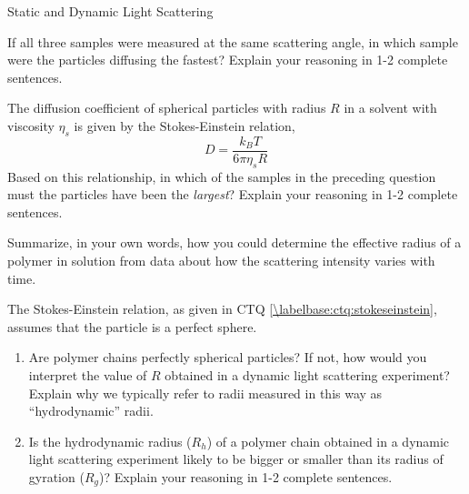 \begin{activity}{Static and Dynamic Light Scattering}
\begin{ctqs}
		If all three samples were measured at the same scattering angle, in which sample were the particles diffusing the fastest?  Explain your reasoning in 1-2 complete sentences.
	
		\begin{solution}[1.25in]{}
		\end{solution}
	
	\question The diffusion coefficient of spherical particles with radius $R$ in a solvent with viscosity $\eta_s$ is given by the Stokes-Einstein relation,
	\begin{equation*}
		D = \frac{ k_B T}{6\pi \eta_s R}
	\end{equation*}
	Based on this relationship, in which of the samples in the preceding question must the particles have been the \emph{largest}?  Explain your reasoning in 1-2 complete sentences. \label{\labelbase:ctq:stokeseinstein}
	
		\begin{solution}[1.25in]{}
		\end{solution}
	
	\question Summarize, in your own words, how you could determine the effective radius of a polymer in solution from data about how the scattering intensity varies with time.
	
		\begin{solution}[1.5in]{}
		\end{solution}

\end{ctqs}



\begin{exercises}

	\exercise The Stokes-Einstein relation, as given in CTQ \ref{\labelbase:ctq:stokeseinstein}, assumes that the particle is a perfect sphere.
	
		\begin{enumerate}
		
			\item Are polymer chains perfectly spherical particles?  If not, how would you interpret the value of $R$ obtained in a dynamic light scattering experiment?  Explain why we typically refer to radii measured in this way as ``hydrodynamic'' radii.
			
			\item Is the hydrodynamic radius ($R_h$) of a polymer chain obtained in a dynamic light scattering experiment likely to be bigger or smaller than its radius of gyration ($R_g$)?  Explain your reasoning in 1-2 complete sentences.
			
		\end{enumerate}
	
\end{exercises}


%
%	


	
\end{activity}